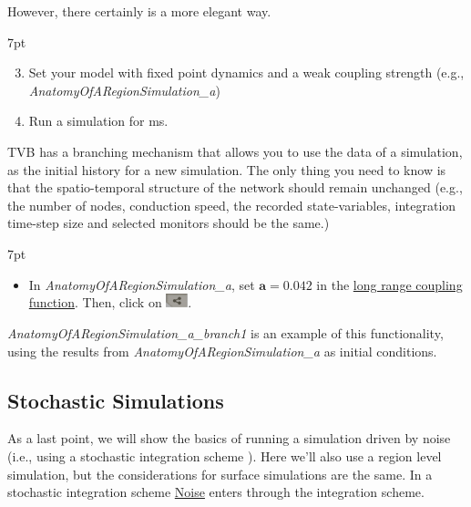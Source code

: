\documentclass{tufte-handout}
\newenvironment{simulation}{%
  \def\FrameCommand{%
    \hspace{1pt}%
    {\color{ForestGreen}\vrule width 2pt}%
    {\color{simulationshade}\vrule width 4pt}%
    \colorbox{simulationshade}%
  }%
  \MakeFramed{\advance\hsize-\width\FrameRestore}%
  \noindent\hspace{-4.55pt}%
  \begin{adjustwidth}{}{7pt}%
  \vspace{2pt}\vspace{2pt}%
}
{%
  \vspace{2pt}\end{adjustwidth}\endMakeFramed%
}
\begin{document}
However, there certainly is a more elegant way. 

\begin{simulation}
\begin{enumerate}[resume]
 \setcounter{enumi}{2}
\item Set your model with fixed point dynamics and a weak coupling strength (e.g., \textit{AnatomyOfARegionSimulation\_a})
\item Run a simulation for \unit[1000]{ms}.
\end{enumerate}
\end{simulation}

TVB has a branching mechanism that allows you to use the data of a simulation, as the initial history for a new simulation. The only thing you
need to know is that the spatio-temporal structure of the network should
remain unchanged (e.g., the number of nodes, conduction speed, the recorded state-variables, integration time-step size and selected monitors should be the same.)

\begin{simulation}
\begin{itemize}[resume]
 \setcounter{enumi}{4}
 \item In \textit{AnatomyOfARegionSimulation\_a}, set $\mathbf{a=0.042}$ in the \underline{long range coupling function}. Then, click on \includegraphics[width=0.05\textwidth]{butt_branching.png}. 
\end{itemize}
\end{simulation}

\textit{AnatomyOfARegionSimulation\_a\_branch1} is an example of this functionality, using the results from \textit{AnatomyOfARegionSimulation\_a} as initial conditions. 

\subsection{Stochastic Simulations}\label{sec:noisy_simulations}


As a last point, we will show the basics of running a simulation driven by
noise (i.e., using a stochastic integration scheme ). Here we'll also use a region
level simulation, but the considerations for surface simulations are the same.
In a stochastic integration scheme \underline{Noise} enters through the integration
scheme. 
\end{document}
